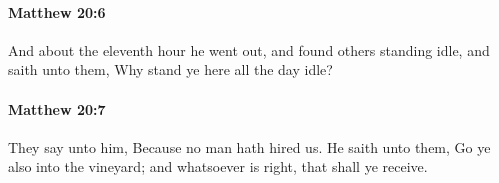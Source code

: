 		\paragraph{Matthew 20:6} %
			\label{MATTHEW-20-6}

			And about the eleventh hour he went out, and found others standing idle, and saith unto them, Why stand ye here all the day idle?

			\begin{framed}
			\scriptsize
				\begin{compactdesc}
					\item[SBLG] 
				\end{compactdesc}
			\end{framed}

		\paragraph{Matthew 20:7} %
			\label{MATTHEW-20-7}

			They say unto him, Because no man hath hired us. He saith unto them, Go ye also into the vineyard; and whatsoever is right, that shall ye receive.

